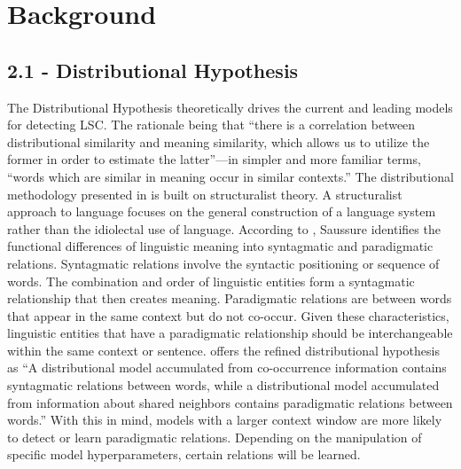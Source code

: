 \section{Background}

\subsection{2.1 - Distributional Hypothesis}

The Distributional Hypothesis theoretically drives the current and leading models for detecting LSC. The rationale being that “there is a correlation between distributional similarity and meaning similarity, which allows us to utilize the former in order to estimate the latter”—in simpler and more familiar terms, “words which are similar in meaning occur in similar contexts.” \citep{sahlgren2008distributional} The distributional methodology presented in \citet{harris1970distributional} is built on structuralist theory. A structuralist approach to language focuses on the general construction of a language system rather than the idiolectal use of language. According to \citet{sahlgren2008distributional}, Saussure identifies the functional differences of linguistic meaning into syntagmatic and paradigmatic relations. Syntagmatic relations involve the syntactic positioning or sequence of words. The combination and order of linguistic entities form a syntagmatic relationship that then creates meaning. Paradigmatic relations are between words that appear in the same context but do not co-occur. Given these characteristics, linguistic entities that have a paradigmatic relationship should be interchangeable within the same context or sentence. \citet{sahlgren2008distributional} offers the refined distributional hypothesis as “A distributional model accumulated from co-occurrence information contains syntagmatic relations between words, while a distributional model accumulated from information about shared neighbors contains paradigmatic relations between words.” With this in mind, models with a larger context window are more likely to detect or learn paradigmatic relations. Depending on the manipulation of specific model hyperparameters, certain relations will be learned. 


